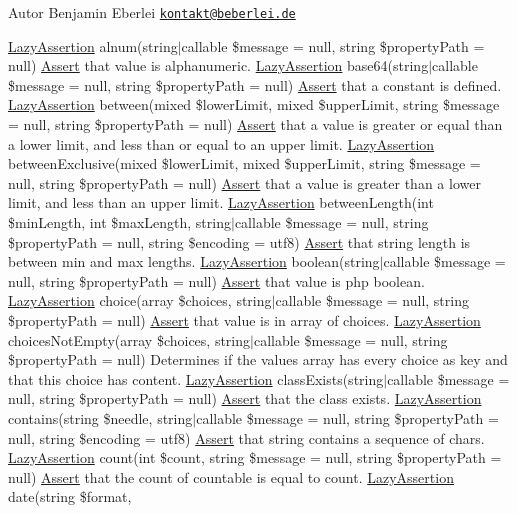 \begin{DoxyAuthor}{Autor}
Benjamin Eberlei \href{mailto:kontakt@beberlei.de}{\tt kontakt@beberlei.\+de}
\end{DoxyAuthor}
\mbox{\hyperlink{class_assert_1_1_lazy_assertion}{Lazy\+Assertion}} alnum(string$\vert$callable \$message = null, string \$property\+Path = null) \mbox{\hyperlink{class_assert_1_1_assert}{Assert}} that value is alphanumeric.  \mbox{\hyperlink{class_assert_1_1_lazy_assertion}{Lazy\+Assertion}} base64(string$\vert$callable \$message = null, string \$property\+Path = null) \mbox{\hyperlink{class_assert_1_1_assert}{Assert}} that a constant is defined.  \mbox{\hyperlink{class_assert_1_1_lazy_assertion}{Lazy\+Assertion}} between(mixed \$lower\+Limit, mixed \$upper\+Limit, string \$message = null, string \$property\+Path = null) \mbox{\hyperlink{class_assert_1_1_assert}{Assert}} that a value is greater or equal than a lower limit, and less than or equal to an upper limit.  \mbox{\hyperlink{class_assert_1_1_lazy_assertion}{Lazy\+Assertion}} between\+Exclusive(mixed \$lower\+Limit, mixed \$upper\+Limit, string \$message = null, string \$property\+Path = null) \mbox{\hyperlink{class_assert_1_1_assert}{Assert}} that a value is greater than a lower limit, and less than an upper limit.  \mbox{\hyperlink{class_assert_1_1_lazy_assertion}{Lazy\+Assertion}} between\+Length(int \$min\+Length, int \$max\+Length, string$\vert$callable \$message = null, string \$property\+Path = null, string \$encoding = \textquotesingle{}utf8\textquotesingle{}) \mbox{\hyperlink{class_assert_1_1_assert}{Assert}} that string length is between min and max lengths.  \mbox{\hyperlink{class_assert_1_1_lazy_assertion}{Lazy\+Assertion}} boolean(string$\vert$callable \$message = null, string \$property\+Path = null) \mbox{\hyperlink{class_assert_1_1_assert}{Assert}} that value is php boolean.  \mbox{\hyperlink{class_assert_1_1_lazy_assertion}{Lazy\+Assertion}} choice(array \$choices, string$\vert$callable \$message = null, string \$property\+Path = null) \mbox{\hyperlink{class_assert_1_1_assert}{Assert}} that value is in array of choices.  \mbox{\hyperlink{class_assert_1_1_lazy_assertion}{Lazy\+Assertion}} choices\+Not\+Empty(array \$choices, string$\vert$callable \$message = null, string \$property\+Path = null) Determines if the values array has every choice as key and that this choice has content.  \mbox{\hyperlink{class_assert_1_1_lazy_assertion}{Lazy\+Assertion}} class\+Exists(string$\vert$callable \$message = null, string \$property\+Path = null) \mbox{\hyperlink{class_assert_1_1_assert}{Assert}} that the class exists.  \mbox{\hyperlink{class_assert_1_1_lazy_assertion}{Lazy\+Assertion}} contains(string \$needle, string$\vert$callable \$message = null, string \$property\+Path = null, string \$encoding = \textquotesingle{}utf8\textquotesingle{}) \mbox{\hyperlink{class_assert_1_1_assert}{Assert}} that string contains a sequence of chars.  \mbox{\hyperlink{class_assert_1_1_lazy_assertion}{Lazy\+Assertion}} count(int \$count, string \$message = null, string \$property\+Path = null) \mbox{\hyperlink{class_assert_1_1_assert}{Assert}} that the count of countable is equal to count.  \mbox{\hyperlink{class_assert_1_1_lazy_assertion}{Lazy\+Assertion}} date(string \$format, 